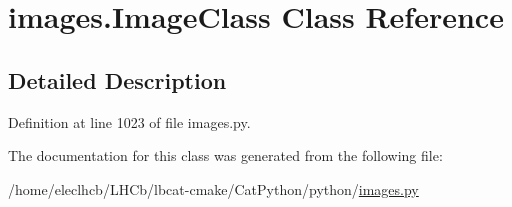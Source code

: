 \hypertarget{classimages_1_1ImageClass}{}\section{images.\+Image\+Class Class Reference}
\label{classimages_1_1ImageClass}


\subsection{Detailed Description}


Definition at line 1023 of file images.\+py.



The documentation for this class was generated from the following file\+:\begin{DoxyCompactItemize}
\item 
/home/eleclhcb/\+L\+H\+Cb/lbcat-\/cmake/\+Cat\+Python/python/\hyperlink{images_8py}{images.\+py}\end{DoxyCompactItemize}
